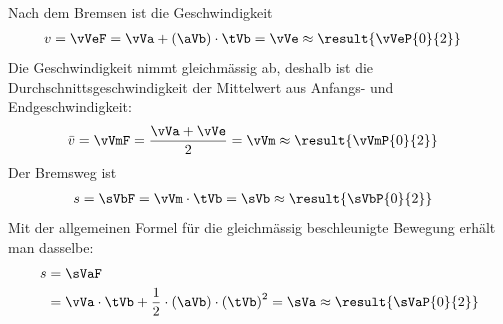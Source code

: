 Nach dem Bremsen ist die Geschwindigkeit
\begin{align}
 v &= \vVeF = \vVa+\left(\aVb\right)\cdot\tVb = \vVe \approx \result{\vVeP{0}{2}}
\end{align}
Die Geschwindigkeit nimmt gleichmässig ab, deshalb ist die Durchschnittsgeschwindigkeit der Mittelwert aus Anfangs- und Endgeschwindigkeit:
\begin{align}
 \bar v &= \vVmF = \frac{\vVa+\vVe}{2} = \vVm \approx \result{\vVmP{0}{2}}
\end{align}
Der Bremsweg ist
\begin{align}
 s &= \sVbF = \vVm\cdot\tVb = \sVb \approx \result{\sVbP{0}{2}}
\end{align}
Mit der allgemeinen Formel für die gleichmässig beschleunigte Bewegung erhält man dasselbe:
\begin{align}
 s &= \sVaF \\
   &= \vVa\cdot\tVb+\frac{1}{2}\cdot\left(\aVb\right)\cdot\left(\tVb\right)^2 = \sVa \approx \result{\sVaP{0}{2}}
\end{align}
